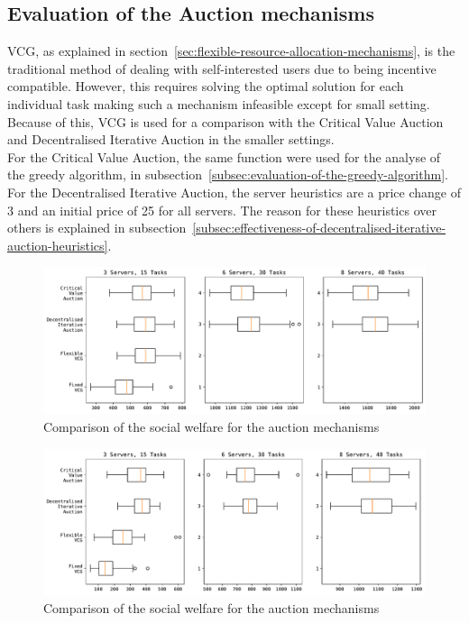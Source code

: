 \subsection{Evaluation of the Auction mechanisms}\label{subsec:evaluation-of-the-auction-mechanisms}
VCG, as explained in section~\ref{sec:flexible-resource-allocation-mechanisms}, is the traditional method of dealing
with self-interested users due to being incentive compatible. However, this requires solving the optimal solution
for each individual task making such a mechanism infeasible except for small setting. Because of this, VCG is used for
a comparison with the Critical Value Auction and Decentralised Iterative Auction in the smaller settings. \\
For the Critical Value Auction, the same function were used for the analyse of the greedy algorithm, in
subsection~\ref{subsec:evaluation-of-the-greedy-algorithm}. For the Decentralised Iterative Auction, the server
heuristics are a price change of 3 and an initial price of 25 for all servers. The reason for these heuristics over
others is explained in subsection~\ref{subsec:effectiveness-of-decentralised-iterative-auction-heuristics}.

\begin{figure}[h]
    \centering
    \includegraphics[width=\linewidth]{figs/auctions/multi_setting_social_welfare.pdf}
    \caption{Comparison of the social welfare for the auction mechanisms}
    \label{fig:auction-mechanisms-social-welfare}
\end{figure}

\begin{figure}[h]
    \centering
    \includegraphics[width=\linewidth]{figs/auctions/multi_setting_revenue.pdf}
    \caption{Comparison of the social welfare for the auction mechanisms}
    \label{fig:auction-mechanisms-revenue}
\end{figure}

